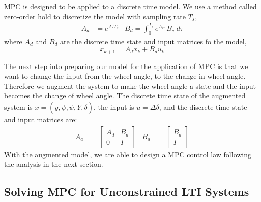 \documentclass{article}
\begin{document}
MPC is designed to be applied to a discrete time model. We use a method called zero-order hold to discretize the model
with sampling rate $T_s$,
\begin{align}
    A_d &= e^{A_cT_s} & B_d = \int_0^{T_s}e^{A_c\tau}B_c\;d\tau
\end{align}
where $A_d$ and $B_d$ are the discrete time state and input matrices fo the model,
\begin{equation}
    x_{k+1} = A_dx_k + B_du_k
\end{equation}

The next step into preparing our model for the application of MPC is that we want to change the input from the wheel
angle, to the change in wheel angle. Therefore we augment the system to make the wheel angle
a state and the input becomes the change of wheel angle. The discrete time state of the augmented system is $x =
(\dot{y}, \psi, \dot{\psi}, Y, \delta)$, the input is $u = \Delta\delta$, and the discrete time state and input
matrices are:
\begin{align}
    A_a &= \begin{bmatrix}
        A_d & B_d \\
        0 & I
    \end{bmatrix} &
    B_a &= \begin{bmatrix}
        B_d \\ I
    \end{bmatrix}
\end{align}
With the augmented model, we are able to design a MPC control law following the analysis in the next section.

\subsection{Solving MPC for Unconstrained LTI Systems}
\label{sec:unconstrained-mpc}
\end{document}

